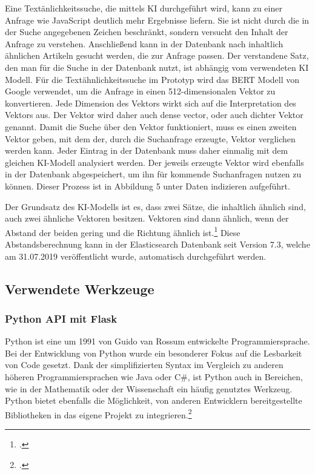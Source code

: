 Eine Textänlichkeitssuche, die mittels KI durchgeführt wird, kann zu einer Anfrage wie \glqq JavaScript\grqq{} deutlich mehr Ergebnisse liefern. Sie ist nicht durch die in der Suche angegebenen Zeichen beschränkt, sondern versucht den Inhalt der Anfrage zu verstehen. Anschließend kann in der Datenbank nach inhaltlich ähnlichen Artikeln gesucht werden, die zur Anfrage passen. Der \glqq verstandene\grqq{} Satz, den man für die Suche in der Datenbank nutzt, ist abhängig vom verwendeten KI Modell. Für die Textähnlichkeitssuche im Prototyp wird das BERT Modell von Google verwendet, um die Anfrage in einen 512-dimensionalen Vektor zu konvertieren. Jede Dimension des Vektors wirkt sich auf die Interpretation des Vektors aus. Der Vektor wird daher auch \glqq dense vector\grqq{}, oder auch dichter Vektor genannt. Damit die Suche über den Vektor funktioniert, muss es einen zweiten Vektor geben, mit dem der, durch die Suchanfrage erzeugte, Vektor verglichen werden kann. Jeder Eintrag in der Datenbank muss daher einmalig mit dem gleichen KI-Modell analysiert werden. Der jeweils erzeugte Vektor wird ebenfalls in der Datenbank abgespeichert, um ihn für kommende Suchanfragen nutzen zu können. Dieser Prozess ist in Abbildung 5 unter \glqq Daten indizieren\grqq{} aufgeführt.

Der Grundsatz des KI-Modells ist es, dass zwei Sätze, die inhaltlich ähnlich sind, auch zwei ähnliche Vektoren besitzen. Vektoren sind dann ähnlich, wenn der Abstand der beiden gering und die Richtung ähnlich ist.\footcite{rahutomo2012semantic} Diese Abstandsberechnung kann in der Elasticsearch Datenbank seit Version 7.3, welche am 31.07.2019 veröffentlicht wurde, automatisch durchgeführt werden. 

\subsection{Verwendete Werkzeuge}
\subsubsection{Python API mit Flask}
Python ist eine um 1991 von Guido van Rossum entwickelte Programmiersprache. Bei der Entwicklung von Python wurde ein besonderer Fokus auf die Lesbarkeit von Code gesetzt. Dank der simplifizierten Syntax im Vergleich zu anderen höheren Programmiersprachen wie Java oder C\#, ist Python auch in Bereichen, wie in der Mathematik oder der Wissenschaft ein häufig genutztes Werkzeug. Python bietet ebenfalls die Möglichkeit, von anderen Entwicklern bereitgestellte Bibliotheken in das eigene Projekt zu integrieren.\footcite{python2021python} 

